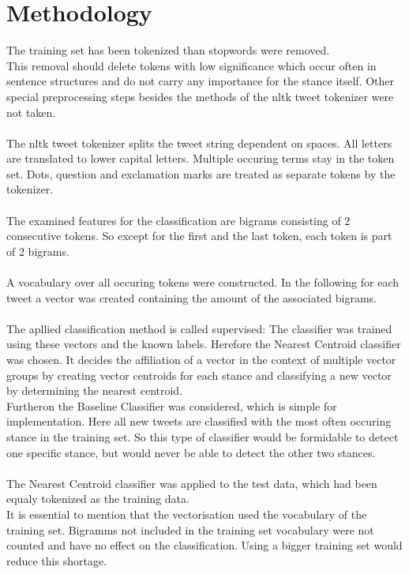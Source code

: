\documentclass[a4paper,12pt,twoside]{article}
\begin{document}
\section{Methodology}
The training set has been tokenized than stopwords were removed. \\
This removal should delete tokens with low significance which occur often in sentence structures and do not carry any importance for the stance itself. Other special preprocessing steps besides the methods of the nltk tweet tokenizer were not taken. \\
\\
The nltk tweet tokenizer splits the tweet string dependent on spaces. All letters are translated to lower capital letters. Multiple occuring terms stay in the token set. Dots, question and exclamation marks are treated as separate tokens by the tokenizer. \cite{tweetTokenize}\\
\\
The examined features for the classification are bigrams consisting of 2 consecutive tokens. So except for the first and the last token, each token is part of 2 bigrams.\\
\\
A vocabulary over all occuring tokens were constructed. In the following for each tweet a vector was created containing the amount of the associated bigrams.\\
\\
The apllied classification method is called supervised: The classifier was trained using these vectors and the known labels. Herefore the Nearest Centroid classifier was chosen. It decides the affiliation of a vector in the context of multiple vector groups by creating vector centroids for each stance and classifying a new vector by determining the nearest centroid. \cite{nearestCentroid}\\
Furtheron the Baseline Classifier was considered, which is simple for implementation. Here all new tweets are classified with the most often occuring stance in the training set. So this type of classifier would be formidable to detect one specific stance, but would never be able to detect the other two stances. \cite{baseline}\\
\\
The Nearest Centroid classifier was applied to the test data, which had been equaly tokenized as the training data. \\
It is essential to mention that the vectorisation used the vocabulary of the training set. Bigramms not included in the training set vocabulary were not counted and have no effect on the classification. Using a bigger training set would reduce this shortage. \\
\end{document}
